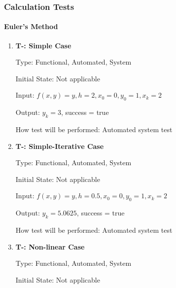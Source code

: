 \documentclass[12pt, titlepage]{article}
\newcounter{tnum} %
\begin{document}
\subsubsection{Calculation Tests}
		
\paragraph{Euler's Method}

\begin{enumerate}

\item{\textbf{T-\thetnum \label{t-euler_simple}: Simple Case}}

Type: Functional, Automated, System %
					
Initial State: Not applicable
					
Input: $f(x, y) = y, h = 2, x_0 = 0, y_0 = 1, x_k = 2$
					
Output: $y_k = 3$, success = true
					
How test will be performed: Automated system test  

\item{\textbf{T-\thetnum \label{t-euler_simpleiterative}: Simple-Iterative Case}}

Type: Functional, Automated, System %
					
Initial State: Not applicable
					
Input: $f(x, y) = y, h = 0.5, x_0 = 0, y_0 = 1, x_k = 2$
					
Output: $y_k = 5.0625$, success = true
					
How test will be performed: Automated system test

\item{\textbf{T-\thetnum \label{t-euler_nonlinear}: Non-linear Case}}

Type: Functional, Automated, System %
					
Initial State: Not applicable
					

\end{enumerate}
\end{document}
